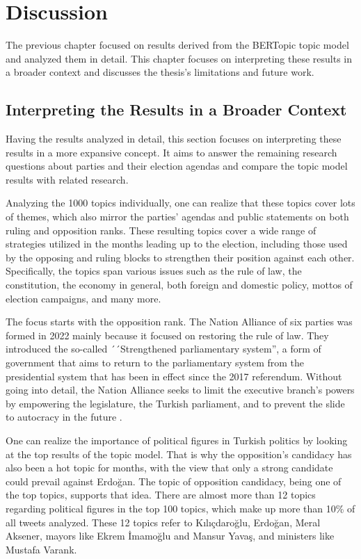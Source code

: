 
\chapter{Discussion}\label{chapter:discussion}

The previous chapter focused on results derived from the BERTopic topic model and analyzed them in 
detail. This chapter focuses on interpreting these results in a broader context and discusses the
thesis's limitations and future work. 

\section{Interpreting the Results in a Broader Context}

Having the results analyzed in detail, this section focuses on interpreting these results in a more 
expansive concept. It aims to answer the remaining research questions about parties and their election 
agendas and compare the topic model results with related research.

Analyzing the 1000 topics individually, one can realize that these topics cover lots of themes, 
which also mirror the parties' agendas and public statements on both ruling and opposition ranks. 
These resulting topics cover a wide range of strategies utilized in the months leading up to the 
election, including those used by the opposing and ruling blocks to strengthen their position against each 
other. Specifically, the topics span various issues such as the rule of law, the constitution, the 
economy in general, both foreign and domestic policy, mottos of election campaigns, and many more.

The focus starts with the opposition rank. The Nation Alliance of six parties was formed in 
2022 mainly because it focused on restoring the rule of law. They introduced the so-called 
´´Strengthened parliamentary system'', a form of government that aims to return to the parliamentary system 
from the presidential system that has been in effect since the 2017 referendum. Without going into detail, 
the Nation Alliance seeks to limit the executive branch's powers by empowering the legislature, the 
Turkish parliament, and to prevent the slide to autocracy in the future \parencite{edgar_sar_opposition_election_agenda_2023}.

One can realize the importance of political figures in Turkish politics by looking at the top results of the topic 
model. That is why the opposition's candidacy has also been a hot topic for months, with the 
view that only a strong candidate could prevail against Erdoğan. The topic of opposition candidacy, 
being one of the top topics, supports that idea. There are almost more than 12 topics regarding political 
figures in the top 100 topics, which make up more than 10\% of all tweets analyzed. These 12 topics refer 
to Kılıçdaroğlu, Erdoğan, Meral Aksener, mayors like Ekrem İmamoğlu and Mansur Yavaş, 
and ministers like Mustafa Varank.

